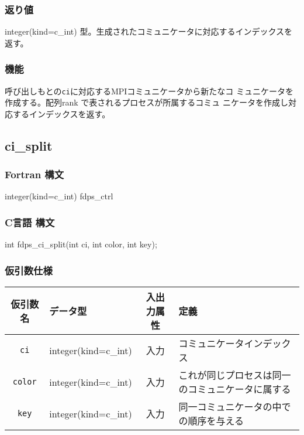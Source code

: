 \subsubsection*{返り値}
integer(kind=c\_int) 型。生成されたコミュニケータに対応するインデックスを返す。


\subsubsection*{機能}
呼び出しもとの{\tt ci}に対応するMPIコミュニケータから新たなコ
ミュニケータを作成する。配列rank で表されるプロセスが所属するコミュ
ニケータを作成し対応するインデックスを返す。

\subsection{ci\_split}
\subsubsection*{Fortran 構文}
\begin{screen}
\begin{spverbatim}
integer(kind=c_int) fdps_ctrl%
\end{spverbatim}
\end{screen}

\subsubsection*{C言語 構文}
\begin{screen}
\begin{spverbatim}
int fdps_ci_split(int ci, int color, int key);
\end{spverbatim}
\end{screen}

\subsubsection*{仮引数仕様}
\begin{table}[h]
\begin{tabularx}{\linewidth}{cXcX}
\toprule
\rowcolor{Snow2}
仮引数名 & データ型 & 入出力属性 & 定義 \\
\midrule
\verb|ci| & integer(kind=c\_int) & 入力 & コミュニケータインデックス\\
\verb|color| & integer(kind=c\_int) & 入力 &これが同じプロセスは同一のコミュニケータに属する\\
\verb|key| & integer(kind=c\_int) & 入力 &同一コミュニケータの中での順序を与える\\
\bottomrule
\end{tabularx}
\end{table}


